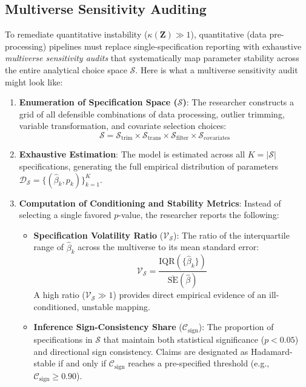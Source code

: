\documentclass{article}
\theoremstyle{definition}
\begin{document}
\subsection{Multiverse Sensitivity Auditing}

To remediate quantitative instability ($\kappa(\mathbf{Z}) \gg 1$), quantitative (data pre-processing) pipelines must replace single-specification reporting with exhaustive \textit{multiverse sensitivity audits} that systematically map parameter stability across the entire analytical choice space $\mathcal{S}$. Here is what a multiverse sensitivity audit might look like:

\begin{enumerate}
    \item \textbf{Enumeration of Specification Space ($\mathcal{S}$)}: The researcher constructs a grid of all defensible combinations of data processing, outlier trimming, variable transformation, and covariate selection choices:$$\mathcal{S} = \mathcal{S}_{\text{trim}} \times \mathcal{S}_{\text{trans}} \times \mathcal{S}_{\text{filter}} \times \mathcal{S}_{\text{covariates}}$$

    \item \textbf{Exhaustive Estimation}: The model is estimated across all $K = \vert{}\mathcal{S}\vert{}$ specifications, generating the full empirical distribution of parameters $\mathcal{D}_{\mathcal{S}} = \{(\hat{\beta}_k, p_k)\}_{k=1}^K$.

    \item \textbf{Computation of Conditioning and Stability Metrics}: Instead of selecting a single favored $p$-value, the researcher reports the following:
    \begin{itemize}
        \item \textbf{Specification Volatility Ratio} ($\mathcal{V}_{\mathcal{S}}$): The ratio of the interquartile range of $\hat{\beta}_k$ across the multiverse to its mean standard error:$$\mathcal{V}_{\mathcal{S}} = \frac{\text{IQR}(\{\hat{\beta}_k\})}{\overline{\text{SE}}(\hat{\beta})}$$A high ratio ($\mathcal{V}_{\mathcal{S}} \gg 1$) provides direct empirical evidence of an ill-conditioned, unstable mapping.
        \item \textbf{Inference Sign-Consistency Share} ($\mathcal{C}_{\text{sign}}$): The proportion of specifications in $\mathcal{S}$ that maintain both statistical significance ($p < 0.05$) and directional sign consistency. Claims are designated as Hadamard-stable if and only if $\mathcal{C}_{\text{sign}}$ reaches a pre-specified threshold (e.g., $\mathcal{C}_{\text{sign}} \ge 0.90$).
    \end{itemize}
\end{enumerate}
\end{document}
